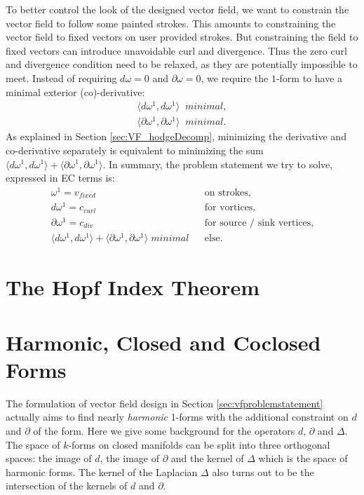 To better control the look of the designed vector field, we want to constrain the vector field to follow some painted strokes. This amounts to constraining the vector field to fixed vectors on user provided strokes. But constraining the field to fixed vectors can introduce unavoidable curl and divergence. Thus the zero curl and divergence condition need to be relaxed, as they are potentially impossible to meet. Instead of requiring $d\omega = 0$ and $\partial \omega = 0$, we require the $1$-form to have a minimal exterior (co)-derivative:
\begin{align*}\langle d\omega^1, d\omega^1\rangle \;\; minimal, \\
\langle \partial\omega^1, \partial\omega^1\rangle \;\; minimal. \end{align*}
As explained in Section \ref{sec:VF_hodgeDecomp}, minimizing the derivative and co-derivative separately is equivalent to minimizing the sum $\langle d\omega^1, d\omega^1\rangle + \langle \partial\omega^1, \partial\omega^1\rangle$. In summary, the problem statement we try to solve, expressed in EC terms is:
\begin{align*}
&\omega^1 = v_{fixed} & & \text{on strokes,}  &\\ 
& d\omega^1 = c_{curl}  & &\text{for vortices,} &\\
& \partial \omega^1 = c_{div}& &\text{for source / sink vertices,} &\\
&\langle d\omega^1, d\omega^1\rangle + \langle\partial \omega^1, \partial \omega^1 \rangle \; minimal & &\text{else.} 
\end{align*}	

\section{The Hopf Index Theorem}



\section{Harmonic, Closed and Coclosed Forms}
\label{sec:vf_harmonicClosedCoclosed}
The formulation of vector field design in Section \ref{sec:vfproblemstatement} actually aims to find  nearly \emph{harmonic} 1-forms with the additional constraint on $d$ and $\partial$ of the form. Here we give some background for the operators $d$, $\partial$ and $\Delta$. The space of $k$-forms on closed  manifolds can be split into three orthogonal spaces: the image of $d$, the image of $\partial$ and the kernel of $\Delta$ which is the space of harmonic forms. The kernel of the Laplacian $\Delta$ also turns out to be the intersection of the kernels of $d$ and $\partial$.

